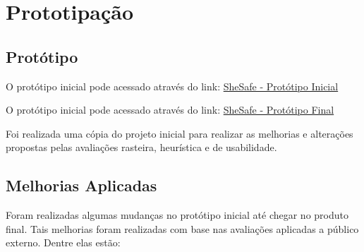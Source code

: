 \chapter{Prototipação}
\section{Protótipo}
O protótipo inicial pode acessado através do link: \href{https://www.figma.com/proto/ZOxt5eHuQt0RjhagaDpuXU/SheSafe?type=design&node-id=26-369&viewport=1892%2C1064%2C0.71&t=gZiNpzVt2mGhuMDV-0&scaling=min-zoom&starting-point-node-id=26%3A653}{SheSafe - Protótipo Inicial}

O protótipo inicial pode acessado através do link: \href{https://www.figma.com/proto/GALwTZKTsmvOVWX4JARmOB/SheSafe-Corrigido?node-id=26-653&viewport=2654%2C786%2C0.79&t=dkVCQTw83BbPw3KK-0&scaling=min-zoom&starting-point-node-id=26%3A653}{SheSafe - Protótipo Final}

Foi realizada uma cópia do projeto inicial para realizar as melhorias e alterações propostas pelas avaliações rasteira, heurística e de usabilidade.

\section{Melhorias Aplicadas}
Foram realizadas algumas mudanças no protótipo inicial até chegar no produto final. Tais melhorias foram realizadas com base nas avaliações aplicadas a público externo. Dentre elas estão:

